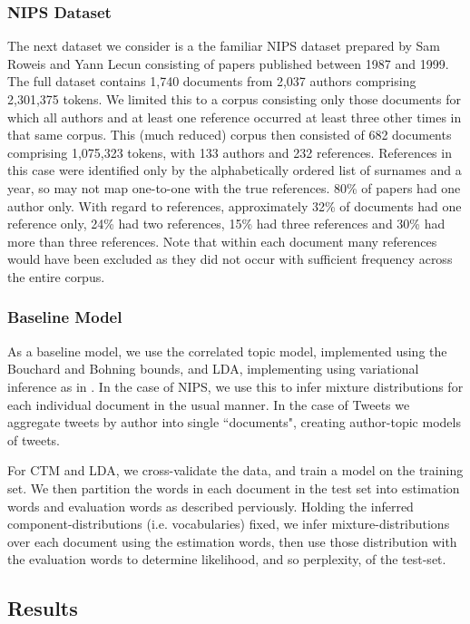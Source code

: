 \subsubsection*{NIPS Dataset}
The next dataset we consider is a the familiar NIPS dataset prepared by Sam Roweis and Yann Lecun consisting of papers published between 1987 and 1999. The full dataset contains 1,740 documents from 2,037 authors comprising 2,301,375 tokens. We limited this to a corpus consisting only those documents for which all authors and at least one reference occurred at least three other times in that same corpus. This (much reduced) corpus then consisted of 682 documents comprising 1,075,323 tokens, with 133 authors and 232 references. References in this case were identified only by the alphabetically ordered list of surnames and a year, so may not map one-to-one with the true references. 80\% of papers had one author only. With regard to references, approximately 32\% of documents had one reference only, 24\% had two references, 15\% had three references and 30\% had more than three references. Note that within each document many references would have been excluded as they did not occur with sufficient frequency across the entire corpus.


\subsubsection{Baseline Model}
As a baseline model, we use the correlated topic model, implemented using the Bouchard and Bohning bounds, and LDA, implementing using variational inference as in \cite{BleiNgJordan2003}. In the case of NIPS, we use this to infer mixture distributions for each individual document in the usual manner. In the case of Tweets we aggregate tweets by author into single ``documents", creating author-topic models of tweets.

For CTM and LDA, we cross-validate the data, and train a model on the training set. We then partition the words in each document in the test set into estimation words and evaluation words as described perviously. Holding the inferred component-distributions (i.e. vocabularies) fixed, we infer mixture-distributions over each document using the estimation words, then use those distribution with the evaluation words to determine likelihood, and so perplexity, of the test-set.

\subsection{Results}
